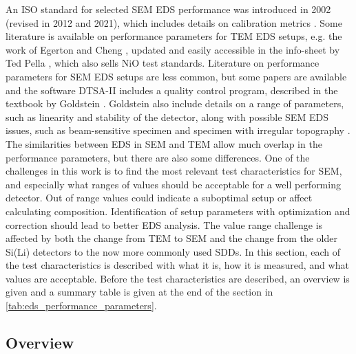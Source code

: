 An ISO standard for selected SEM EDS performance was introduced in 2002 (revised in 2012 and 2021), which includes details on calibration metrics \cite{iso_qc_15632}.
Some literature is available on performance parameters for TEM EDS setups, e.g. the work of Egerton and Cheng \cite{egerton_nio_characterization_1994}, updated and easily accessible in the info-sheet by Ted Pella \cite{ted_pella_nio_tem_2019}, which also sells NiO test standards.
Literature on performance parameters for SEM EDS setups are less common, but some papers \cite{software_dtsaii,dtsaii_1_getting_started,dtsaii_2_manipulating_spectra} are available and the software DTSA-II includes a quality control program, described in the textbook by Goldstein \cite{goldstein_scanning_2018}.
Goldstein also include details on a range of parameters, such as linearity and stability of the detector, along with possible SEM EDS issues, such as beam-sensitive specimen and specimen with irregular topography \cite{goldstein_scanning_2018}.
The similarities between EDS in SEM and TEM allow much overlap in the performance parameters, but there are also some differences.
One of the challenges in this work is to find the most relevant test characteristics for SEM, and especially what ranges of values should be acceptable for a well performing detector.
Out of range values could indicate a suboptimal setup or affect calculating composition.
Identification of setup parameters with optimization and correction should lead to better EDS analysis.
The value range challenge is affected by both the change from TEM to SEM and the change from the older Si(Li) detectors to the now more commonly used SDDs.
In this section, each of the test characteristics is described with what it is, how it is measured, and what values are acceptable.
Before the test characteristics are described, an overview is given and a summary table is given at the end of the section in \cref{tab:eds_performance_parameters}.



\subsection{Overview}
\label{theory:eds_performance:overview}

